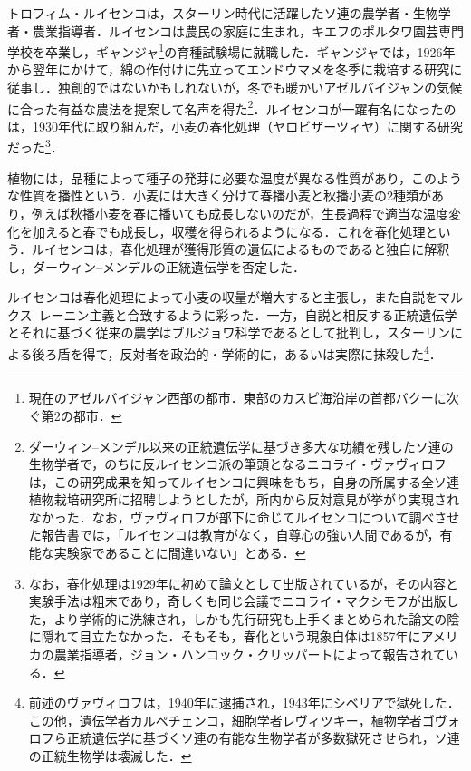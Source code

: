 \documentclass[10pt, a5paper, twoside]{ltjsarticle}
\newcommand{\hyphen}{\insertkanjiskip--\insertkanjiskip}
\begin{document}

            トロフィム・ルイセンコは，スターリン時代に活躍したソ連の農学者・生物学者・農業指導者．ルイセンコは農民の家庭に生まれ，キエフのポルタワ園芸専門学校を卒業し，ギャンジャ\footnote{現在のアゼルバイジャン西部の都市．東部のカスピ海沿岸の首都バクーに次ぐ第2の都市．}の育種試験場に就職した\cite{nakamura,medvedev}．ギャンジャでは，1926年から翌年にかけて，綿の作付けに先立ってエンドウマメを冬季に栽培する研究に従事し．独創的ではないかもしれないが，冬でも暖かいアゼルバイジャンの気候に合った有益な農法を提案して名声を得た\footnote{ダーウィン\hyphen メンデル以来の正統遺伝学に基づき多大な功績を残したソ連の生物学者で，のちに反ルイセンコ派の筆頭となるニコライ・ヴァヴィロフは，この研究成果を知ってルイセンコに興味をもち，自身の所属する全ソ連植物栽培研究所に招聘しようとしたが，所内から反対意見が挙がり実現されなかった．なお，ヴァヴィロフが部下に命じてルイセンコについて調べさせた報告書では，「ルイセンコは教育がなく，自尊心の強い人間であるが，有能な実験家であることに間違いない」とある\cite{medvedev}．}\cite{medvedev}．ルイセンコが一躍有名になったのは，1930年代に取り組んだ，小麦の春化処理（ヤロビザーツィヤ）に関する研究だった\footnote{なお，春化処理は1929年に初めて論文として出版されているが，その内容と実験手法は粗末であり，奇しくも同じ会議でニコライ・マクシモフが出版した，より学術的に洗練され，しかも先行研究も上手くまとめられた論文の陰に隠れて目立たなかった．そもそも，春化という現象自体は1857年にアメリカの農業指導者，ジョン・ハンコック・クリッパートによって報告されている\cite{medvedev}．}．

            植物には，品種によって種子の発芽に必要な温度が異なる性質があり，このような性質を播性という．小麦には大きく分けて春播小麦と秋播小麦の2種類があり，例えば秋播小麦を春に播いても成長しないのだが，生長過程で適当な温度変化を加えると春でも成長し，収穫を得られるようになる．これを春化処理という．ルイセンコは，春化処理が獲得形質の遺伝によるものであると独自に解釈し，ダーウィン\hyphen メンデルの正統遺伝学を否定した．

            ルイセンコは春化処理によって小麦の収量が増大すると主張し，また自説をマルクス\hyphen レーニン主義と合致するように彩った．一方，自説と相反する正統遺伝学とそれに基づく従来の農学はブルジョワ科学であるとして批判し，スターリンによる後ろ盾を得て，反対者を政治的・学術的に，あるいは実際に抹殺した\footnote{前述のヴァヴィロフは，1940年に逮捕され，1943年にシベリアで獄死した．この他，遺伝学者カルペチェンコ，細胞学者レヴィツキー，植物学者ゴヴォロフら正統遺伝学に基づくソ連の有能な生物学者が多数獄死させられ\cite{medvedev}，ソ連の正統生物学は壊滅した．}．
\end{document}

